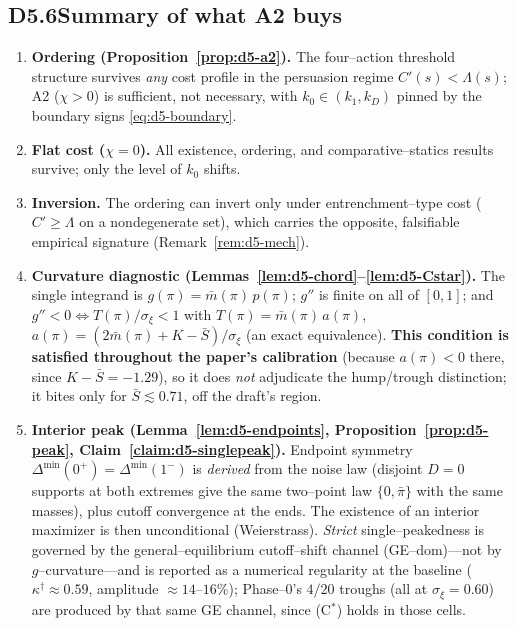 \subsection*{D5.6\quad Summary of what A2 buys}

\begin{enumerate}
\item \textbf{Ordering (Proposition~\ref{prop:d5-a2}).} The four--action
threshold structure survives \emph{any} cost profile in the persuasion regime
$C'(s)<\Lambda(s)$; A2 ($\chi>0$) is sufficient, not necessary, with
$k_0\in(k_1,k_D)$ pinned by the boundary signs \eqref{eq:d5-boundary}.
\item \textbf{Flat cost ($\chi=0$).} All existence, ordering, and
comparative--statics results survive; only the level of $k_0$ shifts.
\item \textbf{Inversion.} The ordering can invert only under entrenchment--type
cost ($C'\ge\Lambda$ on a nondegenerate set), which carries the opposite,
falsifiable empirical signature (Remark~\ref{rem:d5-mech}).
\item \textbf{Curvature diagnostic (Lemmas~\ref{lem:d5-chord}--\ref{lem:d5-Cstar}).}
The single integrand is $g(\pi)=\bar m(\pi)\,p(\pi)$; $g''$ is finite on all of
$[0,1]$; and $g''<0\iff T(\pi)/\sigma_\xi<1$ with $T(\pi)=\bar m(\pi)\,a(\pi)$,
$a(\pi)=(2\bar m(\pi)+K-\bar S)/\sigma_\xi$ (an exact equivalence). \textbf{This
condition is satisfied throughout the paper's calibration} (because $a(\pi)<0$
there, since $K-\bar S=-1.29$), so it does \emph{not} adjudicate the hump/trough
distinction; it bites only for $\bar S\lesssim0.71$, off the draft's region.
\item \textbf{Interior peak (Lemma~\ref{lem:d5-endpoints},
Proposition~\ref{prop:d5-peak}, Claim~\ref{claim:d5-singlepeak}).} Endpoint
symmetry $\Delta^{\min}(0^+)=\Delta^{\min}(1^-)$ is \emph{derived} from the
noise law (disjoint $D=0$ supports at both extremes give the same two--point law
$\{0,\bar\pi\}$ with the same masses), plus cutoff convergence at the ends. The
existence of an interior maximizer is then unconditional (Weierstrass).
\emph{Strict} single--peakedness is governed by the general--equilibrium
cutoff--shift channel (GE--dom)---not by $g$--curvature---and is reported as a
numerical regularity at the baseline ($\kappa^{\dagger}\approx0.59$, amplitude
$\approx14$--$16\%$); Phase--0's $4/20$ troughs (all at $\sigma_\xi=0.60$) are
produced by that same GE channel, since (C$^\ast$) holds in those cells.
\end{enumerate}
